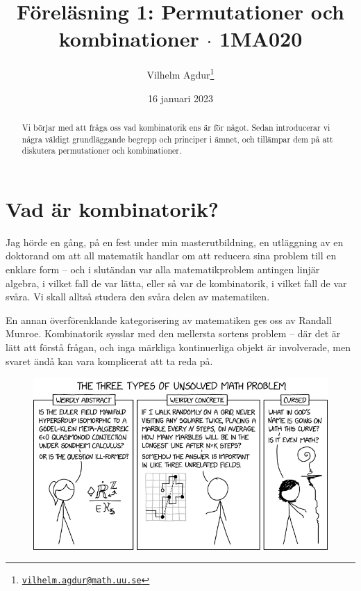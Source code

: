 \documentclass{tufte-handout}
\title{Föreläsning 1: Permutationer och kombinationer $\cdot$ 1MA020}
\author[Vilhelm Agdur]{Vilhelm Agdur\thanks{\href{mailto:vilhelm.agdur@math.uu.se}{\nolinkurl{vilhelm.agdur@math.uu.se}}}}
\date{16 januari 2023}
\begin{document}
\maketitle%

\begin{abstract}
\noindent
Vi börjar med att fråga oss vad kombinatorik ens är för något. Sedan introducerar vi några väldigt grundläggande begrepp och principer i ämnet, och tillämpar dem på att diskutera permutationer och kombinationer.
\end{abstract}

\section{Vad är kombinatorik?}

Jag hörde en gång, på en fest under min masterutbildning, en utläggning av en doktorand om att all matematik handlar om att reducera sina problem till en enklare form -- och i slutändan var alla matematikproblem antingen linjär algebra, i vilket fall de var lätta, eller så var de kombinatorik, i vilket fall de var svåra. Vi skall alltså studera den svåra delen av matematiken.

En annan överförenklande kategorisering av matematiken ges oss av Randall Munroe.\cite{XKCD_math_classification} Kombinatorik sysslar med den mellersta sortens problem -- där det är lätt att förstå frågan, och inga märkliga kontinuerliga objekt är involverade, men svaret ändå kan vara komplicerat att ta reda på.

\begin{figure}[h]
	\includegraphics{graphics/unsolved_math_problems.png}
\end{figure}
\end{document}
